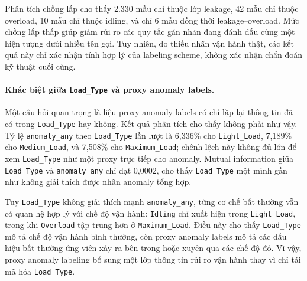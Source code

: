 Phân tích chồng lấp cho thấy 2.330 mẫu chỉ thuộc lớp leakage, 42 mẫu chỉ thuộc overload,
10 mẫu chỉ thuộc idling, và chỉ 6 mẫu đồng thời leakage--overload. Mức chồng lấp thấp
giúp giảm rủi ro các quy tắc gán nhãn đang đánh dấu cùng một hiện tượng dưới nhiều tên gọi.
Tuy nhiên, do thiếu nhãn vận hành thật, các kết quả này chỉ xác nhận tính hợp lý của
labeling scheme, không xác nhận chẩn đoán kỹ thuật cuối cùng.

\paragraph{Khác biệt giữa \texttt{Load\_Type} và proxy anomaly labels.}
Một câu hỏi quan trọng là liệu proxy anomaly labels có chỉ lặp lại thông tin đã có trong
\texttt{Load\_Type} hay không. Kết quả phân tích cho thấy không phải như vậy.
Tỷ lệ \texttt{anomaly\_any} theo \texttt{Load\_Type} lần lượt là 6,336\% cho
\texttt{Light\_Load}, 7,189\% cho \texttt{Medium\_Load}, và 7,508\% cho
\texttt{Maximum\_Load}; chênh lệch này không đủ lớn để xem \texttt{Load\_Type}
như một proxy trực tiếp cho anomaly. Mutual information giữa \texttt{Load\_Type}
và \texttt{anomaly\_any} chỉ đạt 0,0002, cho thấy \texttt{Load\_Type} một mình
gần như không giải thích được nhãn anomaly tổng hợp.

\begin{table}[htbp]
\caption{TỶ LỆ PROXY ANOMALY THEO \texttt{Load\_Type}}
\label{tab:loadtype_anomaly}
\centering
\small
{}
\end{table}

Tuy \texttt{Load\_Type} không giải thích mạnh \texttt{anomaly\_any}, từng cơ chế bất thường
vẫn có quan hệ hợp lý với chế độ vận hành: \texttt{Idling} chỉ xuất hiện trong
\texttt{Light\_Load}, trong khi \texttt{Overload} tập trung hơn ở \texttt{Maximum\_Load}.
Điều này cho thấy \texttt{Load\_Type} mô tả chế độ vận hành bình thường, còn proxy anomaly
labels mô tả các dấu hiệu bất thường ứng viên xảy ra bên trong hoặc xuyên qua các chế độ đó.
Vì vậy, proxy anomaly labeling bổ sung một lớp thông tin rủi ro vận hành thay vì chỉ tái mã hóa
\texttt{Load\_Type}.

